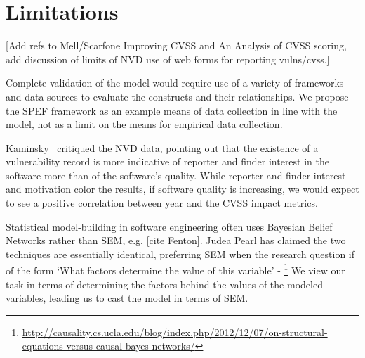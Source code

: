\section{Limitations}
\label{sec:limitations}

[Add refs to Mell/Scarfone Improving CVSS and An Analysis of CVSS scoring, add discussion of limits of NVD use of web forms for reporting vulns/cvss.]

Complete validation of the model would require use of a variety of frameworks and data sources to evaluate the constructs and their relationships. We propose the SPEF framework as an example means of data collection in line with the model, not as a limit on the means for empirical data collection. 

Kaminsky~\cite{kaminsky2011showing} critiqued the NVD data, pointing out that the existence of a vulnerability record is more indicative of reporter and finder interest in the software more than of the software's quality. While reporter and finder interest and motivation color the results, if software quality is increasing, we would expect to see a positive correlation between year and the CVSS impact metrics.

Statistical model-building in software engineering often uses Bayesian Belief Networks rather than SEM, e.g. [cite Fenton]. Judea Pearl has claimed the two techniques are essentially identical, preferring SEM when the research question if of the form `What factors determine the value of this variable' - \footnote{\url{http://causality.cs.ucla.edu/blog/index.php/2012/12/07/on-structural-equations-versus-causal-bayes-networks/}} We view our task in terms of determining the factors behind the values of the modeled variables, leading us to cast the model in terms of SEM.